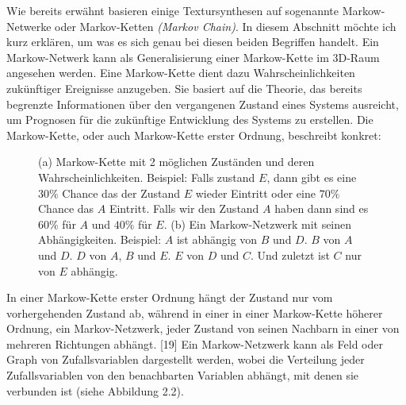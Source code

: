 \documentclass[12pt, a4paper,twoside,openright]{report}
\begin{document}
Wie bereits erwähnt basieren einige Textursynthesen auf sogenannte Markow-Netwerke oder Markov-Ketten \textit{(Markov Chain)}.
In diesem Abschnitt möchte ich kurz erklären, um was es sich genau bei diesen beiden Begriffen handelt.
Ein Markow-Netwerk kann als Generalisierung einer Markow-Kette im 3D-Raum angesehen werden.
Eine Markow-Kette dient dazu Wahrscheinlichkeiten zukünftiger Ereignisse anzugeben.
Sie basiert auf die Theorie, das bereits begrenzte Informationen über den vergangenen Zustand eines Systems ausreicht,
um Prognosen für die zukünftige Entwicklung des Systems zu erstellen.
Die Markow-Kette, oder auch Markow-Kette erster Ordnung, beschreibt konkret:

\begin{figure}[H]
    \centering
    \qquad
    \caption{(a) Markow-Kette mit 2 möglichen Zuständen und deren Wahrscheinlichkeiten.
    Beispiel: Falls zustand $E$, dann gibt es eine $30\%$ Chance das der Zustand $E$ wieder Eintritt oder eine $70\%$ Chance das $A$ Eintritt.
    Falls wir den Zustand $A$ haben dann sind es $60\%$ für $A$ und $40\%$ für $E$. (b) Ein Markow-Netzwerk mit seinen Abhängigkeiten.
    Beispiel: $A$ ist abhängig von $B$ und $D$. $B$ von $A$ und $D$. $D$ von $A$, $B$ und $E$. $E$ von $D$ und $C$. Und zuletzt ist $C$ nur von $E$ abhängig.}%
\end{figure}

In einer Markow-Kette erster Ordnung hängt der Zustand nur vom vorhergehenden Zustand ab,
während in einer in einer Markow-Kette höherer Ordnung, ein Markov-Netzwerk, jeder Zustand von seinen Nachbarn in einer von mehreren Richtungen abhängt. {[19]}
Ein Markow-Netzwerk kann als Feld oder Graph von Zufallsvariablen dargestellt werden,
wobei die Verteilung jeder Zufallsvariablen von den benachbarten Variablen abhängt, mit denen sie verbunden ist {(siehe Abbildung 2.2)}.
\end{document}
